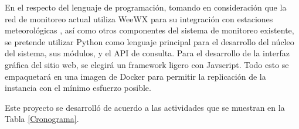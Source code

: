 

En el respecto del lenguaje de programación, tomando en consideración que la red de monitoreo actual utiliza WeeWX para su integración con estaciones meteorológicas \cite{red_climatologica_uacj}, así como otros componentes del sistema de monitoreo existente, se pretende utilizar Python como lenguaje principal para el desarrollo del núcleo del sistema, sus módulos, y el API de consulta. Para el desarrollo de la interfaz gráfica del sitio web, se elegirá un framework ligero con Javscript. Todo esto se empaquetará en una imagen de Docker para permitir la replicación de la instancia con el mínimo esfuerzo posible.


Este proyecto se desarrolló de acuerdo a las actividades que se muestran en la Tabla \ref{Cronograma}.


